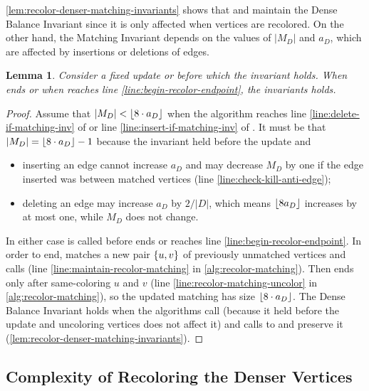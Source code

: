 \documentclass[a4paper,english,11pt]{amsart}
\newtheorem{lemma}{Lemma}[section]
\theoremstyle{definition}
\DeclarePairedDelimiter{\floor}{\lfloor}{\rfloor}
\DeclarePairedDelimiter{\set}{\{}{\}}
\begin{document}
\cref{lem:recolor-denser-matching-invariants} shows that \RecolorInsert and \RecolorDelete maintain the Dense Balance Invariant since it is only affected when vertices are recolored. On the other hand, the Matching Invariant depends on the values of $|M_D|$ and $a_D$, which are affected by insertions or deletions of edges.
\begin{lemma}
    \label{lem:matching-inv}
    Consider a fixed update  or  before which the invariant holds. When  ends or when  reaches line \ref{line:begin-recolor-endpoint}, the invariants holds.
\end{lemma}

\begin{proof}
    Assume that $|M_D| < \floor{ 8 \cdot a_D }$ when the algorithm reaches line \ref{line:delete-if-matching-inv} of \RecolorDelete or line \ref{line:insert-if-matching-inv} of \RecolorInsert. It must be that $|M_D| = \floor{ 8 \cdot a_D} - 1$ because the invariant held before the update and
    \begin{itemize}
        \item inserting an edge cannot increase $a_D$ and may decrease $M_D$ by one if the edge inserted was between matched vertices (line \ref{line:check-kill-anti-edge});
        \item deleting an edge may increase $a_D$ by $2/|D|$, which means $\floor{ 8 a_D }$ increases by at most one, while $M_D$ does not change.
    \end{itemize}
    In either case \AddAntiEdgeMatching is called before \RecolorDelete ends or \RecolorInsert reaches line \ref{line:begin-recolor-endpoint}. In order to end, \AddAntiEdgeMatching matches a new pair $\set{u,v}$ of previously unmatched vertices and calls  (line \ref{line:maintain-recolor-matching} in \cref{alg:recolor-matching}). Then  ends only after same-coloring $u$ and $v$ (line \ref{line:recolor-matching-uncolor} in \cref{alg:recolor-matching}), so the updated matching has size $\floor{ 8 \cdot a_D }$. The Dense Balance Invariant holds when the algorithms call \AddAntiEdgeMatching (because it held before the update and  uncoloring vertices does not affect it) and calls to \RecolorMatching and \RecolorDense preserve it (\cref{lem:recolor-denser-matching-invariants}).
\end{proof}

\subsection{Complexity of Recoloring the Denser Vertices}
\label{sec:denser}
\end{document}
